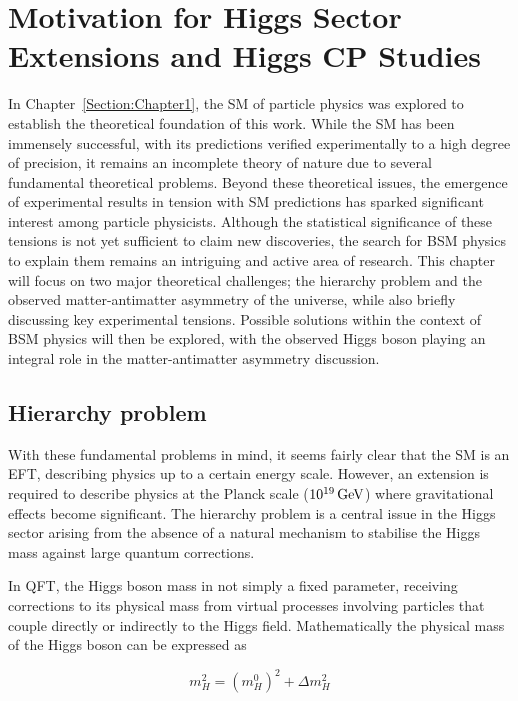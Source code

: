 \chapter{Motivation for Higgs Sector Extensions and Higgs CP Studies}
\thispagestyle{plain}  %
\pagestyle{chapterpages}
\label{Section:Chapter2}

In Chapter~\ref{Section:Chapter1}, the SM of particle physics was explored to establish the theoretical foundation of this work. While the SM has been immensely successful, with its predictions verified experimentally to a high degree of precision, it remains an incomplete theory of nature due to several fundamental theoretical problems. Beyond these theoretical issues, the emergence of experimental results in tension with SM predictions has sparked significant interest among particle physicists. Although the statistical significance of these tensions is not yet sufficient to claim new discoveries, the search for BSM physics to explain them remains an intriguing and active area of research. This chapter will focus on two major theoretical challenges; the hierarchy problem and the observed matter-antimatter asymmetry of the universe, while also briefly discussing key experimental tensions. Possible solutions within the context of BSM physics will then be explored, with the observed Higgs boson playing an integral role in the matter-antimatter asymmetry discussion.

\section{Hierarchy problem}
With these fundamental problems in mind, it seems fairly clear that the SM is an \ac{EFT}, describing physics up to a certain energy scale. However, an extension is required to describe physics at the Planck scale ($10^{19}\,\text{Ge\hspace{-.08em}V}$) where gravitational effects become significant. The hierarchy problem is a central issue in the Higgs sector arising from the absence of a natural mechanism to stabilise the Higgs mass against large quantum corrections.

In QFT, the Higgs boson mass in not simply a fixed parameter, receiving corrections to its physical mass from virtual processes involving particles that couple directly or indirectly to the Higgs field. Mathematically the physical mass of the Higgs boson can be expressed as

\begin{equation}
    m_H^2 = (m_H^0)^2 + \Delta m_H^2
\label{Equation:Chapter2_HiggsBosonMass}
\end{equation}

